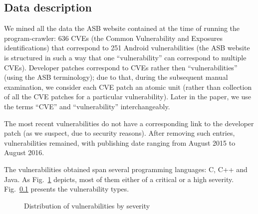 \subsection{Data description}

We mined all the data the ASB website contained at the time of running the program-crawler: 636 CVEs (the Common Vulnerability and Exposures identifications) that correspond to 251 Android vulnerabilities (the ASB website is structured in such a way that one ``vulnerability'' can correspond to multiple CVEs). Developer patches correspond to CVEs rather then ``vulnerabilities'' (using the ASB terminology); due to that, during the subsequent manual examination, we consider each CVE patch an atomic unit (rather than collection of all the CVE patches for a particular vulnerability). Later in the paper, we use the terms ``CVE'' and ``vulnerability'' interchangeably. %

The most recent vulnerabilities do not have a corresponding link to the developer patch (as we suspect, due to security reasons). After removing such entries, \numvuln vulnerabilities remained, with publishing date ranging from August 2015 to August 2016.

The vulnerabilities obtained span several programming languages: C, C++ and Java. As Fig.~\ref{figure:severity} depicts, most of them either of a critical or a high severity. Fig.~\ref{} presents the vulnerability types. \todo{}

\begin{figure}
    \small \caption{Distribution of vulnerabilities by severity}
        \label{figure:severity}
    \vspace{-0.2in}
\end{figure}
